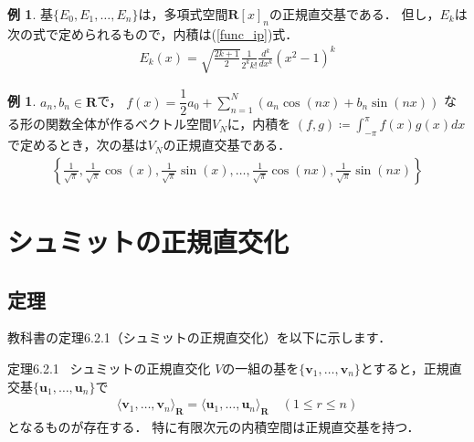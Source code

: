 \documentclass[dvipdfmx]{jsarticle}
\theoremstyle{definition}
\newtheorem{example}[definition]{例}
\begin{document}
\vspace{\baselineskip}

\begin{example}
    \label{ex_polspaceno}
    基$\{ E_0, E_1, \ldots, E_n \}$は，多項式空間$\bm{R}[x]_n$の正規直交基である．
    但し，$E_k$は次の式で定められるもので，内積は(\ref{func_ip})式．
    \begin{align*}
        E_k(x) = \sqrt{\frac{2k+1}{2}} \frac{1}{2^k k!} \frac{d^k}{dx^k} (x^2 - 1)^k
    \end{align*}
\end{example}

\vspace{\baselineskip}

\begin{example}
    $a_n, b_n \in \bm{R}$で，
    $f(x) = \dfrac{1}{2} a_0 + {\displaystyle \sum_{n=1}^N} (a_n \cos(nx) + b_n \sin(nx))$
    なる形の関数全体が作るベクトル空間$V_N$に，内積を
    $(f, g) \coloneqq {\displaystyle \int_{-\pi}^{\pi}} f(x) g(x) dx$
    で定めるとき，次の基は$V_N$の正規直交基である．
    \begin{align*}
        \left\{
            \frac{1}{\sqrt{\pi}},
            \frac{1}{\sqrt{\pi}} \cos(x),
            \frac{1}{\sqrt{\pi}} \sin(x),
            \ldots,
            \frac{1}{\sqrt{\pi}} \cos(nx),
            \frac{1}{\sqrt{\pi}} \sin(nx)
        \right\}
    \end{align*}
\end{example}


\section{シュミットの正規直交化}

\subsection{定理}
教科書の定理6.2.1（シュミットの正規直交化）を以下に示します．

\begin{itembox}[l]{定理6.2.1 \ シュミットの正規直交化}
$V$の一組の基を$\{\bm{v}_1, \ldots, \bm{v}_n\}$とすると，正規直交基$\{\bm{u}_1, \ldots, \bm{u}_n\}$で
\begin{align*}
    \langle \bm{v}_1, \ldots, \bm{v}_n \rangle_{\bm{R}} = \langle \bm{u}_1, \ldots, \bm{u}_n \rangle_{\bm{R}} \quad (1 \leq r \leq n)
\end{align*}
となるものが存在する．
特に有限次元の内積空間は正規直交基を持つ．
\end{itembox}
\end{document}
